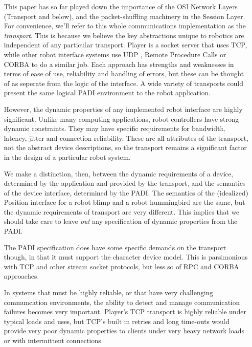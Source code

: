 \documentclass[letterpaper, 10 pt, conference]{iros03}
\begin{document}
This paper has so far played down the importance of the OSI Network
Layers (Transport and below), and the packet-shuffling machinery in
the Session Layer. For convenience, we'll refer to this whole
communications implementation as the {\em transport}. This is because
we believe the key abstractions unique to robotics are independent of
any particular transport. Player is a socket server that uses TCP,
while other robot interface systems use UDP \cite{Werger00},
Remote Procedure Calls or CORBA \cite{Holness01} to do a similar
job. Each approach has strengths and weaknesses in terms of ease of
use, reliability and handling of errors, but these can be thought of
as seperate from the logic of the interface. A wide variety of
transports could present the same logical PADI environment to the robot
application.

However, the dynamic properties of any implemented robot interface are
highly significant. Unlike many computing applications, robot
controllers have strong dynamic constraints. They may have specific
requirements for bandwidth, latency, jitter and connection
reliability. These are all attributes of the transport, not the
abstract device descriptions, so the transport remains a significant
factor in the design of a particular robot system.

We make a distinction, then, between the dynamic requirements of a
device, determined by the application and provided by the transport,
and the semantics of the device interface, determined by the PADI. The
semantics of the (idealized) Position interface for a robot blimp and a
robot hummingbird are the same, but the dynamic requirements of
transport are very different. This implies that we should take care to
leave {\em out} any specification of dynamic properties from the PADI.

The PADI specification does have some specific demands on the
transport though, in that it must support the character device
model. This is parsimonious with TCP and other stream socket
protocols, but less so of RPC and CORBA approaches.

In systems that must be highly reliable, or that have very challenging
communcation environments, the ability to detect and manage
communication failures becomes very important. Player's TCP transport
is highly reliable under typical loads and uses, but TCP's built in
retries and long time-outs would provide very poor dynamic properties
to clients under very heavy network loads or with intermittent
connections.
\end{document}
